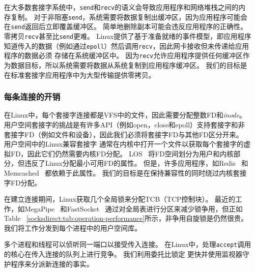在大多数套接字系统中，\texttt {send}和\texttt {recv}的语义会导致应用程序和网络堆栈之间的内存复制。 对于非阻塞\texttt {send}，系统需要将数据复制出缓冲区，因为应用程序可能会在\texttt {send}返回后立即覆盖缓冲区。 简单地删除副本可能会违反应用程序的正确性。
零拷贝\texttt {recv}甚至比\texttt {send}更难。
Linux提供了基于准备就绪的事件模型，即应用程序知道传入的数据（例如通过\texttt {epoll}）然后调用\texttt {recv}，因此网卡接收但未传递给应用程序的数据必须 存储在系统缓冲区中。
因为\texttt {recv}允许应用程序提供任何缓冲区作为数据目标，所以系统需要将数据从系统复制到应用程序缓冲区。
我们的目标是在标准套接字应用程序中为大型传输提供零拷贝。



\subsubsection{每条连接的开销}
\label{socksdirect:subsec:per-connection-overhead}
\quad

在Linux中，每个套接字连接都是VFS中的文件，因此需要分配整数FD和\emph {inode}。
用户空间套接字的挑战是有许多API（例如open，close和epoll）支持套接字和非套接字FD（例如文件和设备），因此我们必须将套接字FD与其他FD区分开来。
用户空间中的Linux兼容套接字 \cite {libvma,rsockets}通常在内核中打开一个文件以获取每个套接字的虚拟FD，因此它们仍然需要内核FD分配。
LOS~ \cite {huang2017high}将FD空间划分为用户和内核部分，但违反了Linux分配最小可用FD的属性。
但是，许多应用程序，如Redis~ \cite {redis}和Memcached~ \cite {memcached}都依赖于此属性。
我们的目标是在保持兼容性的同时绕过内核套接字FD分配。

在建立连接期间，Linux获取几个全局锁来分配TCB（TCP控制块）。
最近的工作，如MegaPipe~ \cite {han2012megapipe}和FastSocket~ \cite {lin2016scalable}通过对全局表进行分区来减少锁争用，但正如Table~ \ref {socksdirect:tab:operation-performance}所示，非争用自旋锁是仍然很贵。
我们将工作分发到每个进程中的用户空间库\libipc {}。

多个进程和线程可以侦听同一端口以接受传入连接。
在Linux中，处理\texttt {accept}调用的核心在传入连接的队列上进行竞争。
我们利用委托比锁定 \cite {roghanchi2017ffwd}更快并使用监视器守护程序来分派新连接的事实。




